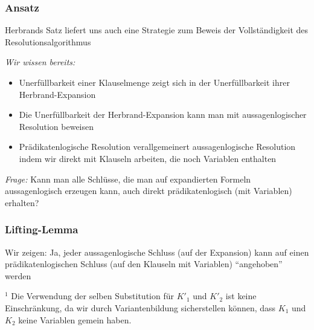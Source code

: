 \documentclass[onlymath]{beamer}
\begin{document}
\begin{frame}\frametitle{Ansatz}

\alert{Herbrands Satz liefert uns auch eine Strategie zum Beweis der Vollständigkeit des Resolutionsalgorithmus}\bigskip

\emph{Wir wissen bereits:}
\begin{itemize}
\item Unerfüllbarkeit einer Klauselmenge zeigt sich in der Unerfüllbarkeit ihrer Herbrand-Expansion
\item Die Unerfüllbarkeit der Herbrand-Expansion kann man mit aussagenlogischer Resolution beweisen
\item Prädikatenlogische Resolution verallgemeinert aussagenlogische Resolution indem wir direkt mit Klauseln arbeiten, die noch Variablen enthalten
\end{itemize}\pause

\emph{Frage:} Kann man alle Schlüsse, die man auf expandierten Formeln aussagenlogisch erzeugen kann, auch direkt prädikatenlogisch (mit Variablen) erhalten?

\end{frame}

\begin{frame}\frametitle{Lifting-Lemma}

Wir zeigen: Ja, jeder aussagenlogische Schluss (auf der Expansion) kann auf einen prädikatenlogischen Schluss (auf den Klauseln mit Variablen) "`angehoben"' werden\medskip


\color{devilscss}
{\footnotesize ${^1}$ Die Verwendung der selben Substitution für $K'_1$ und $K'_2$ ist keine Einschränkung, da wir durch Variantenbildung sicherstellen können, dass $K_1$ und $K_2$ keine Variablen gemein haben.

}

\end{frame}
\end{document}
